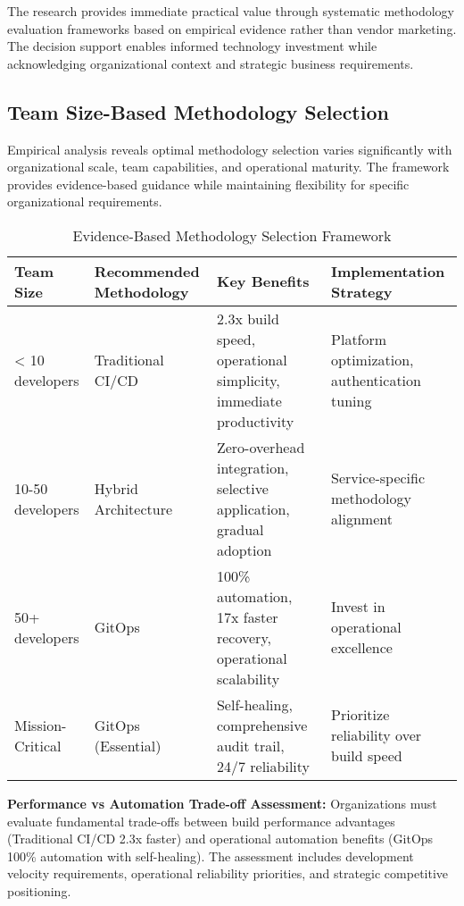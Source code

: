 The research provides immediate practical value through systematic methodology evaluation frameworks based on empirical evidence rather than vendor marketing. The decision support enables informed technology investment while acknowledging organizational context and strategic business requirements.

\subsection{Team Size-Based Methodology Selection}
\label{subsec:team_size_selection}

Empirical analysis reveals optimal methodology selection varies significantly with organizational scale, team capabilities, and operational maturity. The framework provides evidence-based guidance while maintaining flexibility for specific organizational requirements.

\begin{table}[H]
\centering
\caption{Evidence-Based Methodology Selection Framework}
\label{tab:methodology_selection_framework}
\begin{tabular}{|p{2.5cm}|p{2.8cm}|p{3.5cm}|p{4cm}|}
\hline
\textbf{Team Size} & \textbf{Recommended Methodology} & \textbf{Key Benefits} & \textbf{Implementation Strategy} \\
\hline
< 10 developers & Traditional CI/CD & 2.3x build speed, operational simplicity, immediate productivity & Platform optimization, authentication tuning \\
\hline
10-50 developers & Hybrid Architecture & Zero-overhead integration, selective application, gradual adoption & Service-specific methodology alignment \\
\hline
50+ developers & GitOps & 100\% automation, 17x faster recovery, operational scalability & Invest in operational excellence \\
\hline
Mission-Critical & GitOps (Essential) & Self-healing, comprehensive audit trail, 24/7 reliability & Prioritize reliability over build speed \\
\hline
\end{tabular}
\end{table}

\textbf{Performance vs Automation Trade-off Assessment:}
Organizations must evaluate fundamental trade-offs between build performance advantages (Traditional CI/CD 2.3x faster) and operational automation benefits (GitOps 100\% automation with self-healing). The assessment includes development velocity requirements, operational reliability priorities, and strategic competitive positioning.

